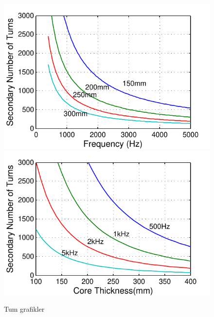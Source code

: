 \documentclass[a4paper, 11pt]{article} %
\begin{document}
\begin{figure}[]
  \centering
    \includegraphics[]{secondary_Nturns_core}
    \includegraphics[]{secondary_Nturns_freq}
  \caption{Tum grafikler}
  \label{primary_thickness}
\end{figure}




\clearpage


\end{document}
